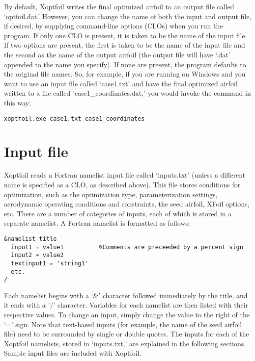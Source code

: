 \documentclass[11pt]{article}
\begin{document}
By default, Xoptfoil writes the final optimized airfoil to an output file called
`optfoil.dat.'  However, you can change the name of both the input and output file, if
desired, by supplying command-line options (CLOs) when you run the program.  If only one 
CLO is present, it is
taken to be the name of the input file.  If two options are present, the first is taken to
be the name of the input file and the second as
the name of the output airfoil (the output file will have `.dat' appended to the name you
specify). If none are present, the program defaults to the
original file names.  So, for example, if you are running on Windows and you want to
use an input file called `case1.txt' and have the final optimized airfoil written to a
file called 'case1\_coordinates.dat,' you would invoke the command in this way:

\begin{verbatim}
xoptfoil.exe case1.txt case1_coordinates
\end{verbatim}

\section{Input file}

Xoptfoil reads a Fortran namelist input file called `inputs.txt' (unless a different name
is specified as a CLO, as described above).  This file stores
conditions for optimization, such as the optimization type, parameterization settings,
aerodynamic operating conditions and constraints, the seed airfoil, XFoil options, etc.
There are a number of categories of inputs, each of which is stored in a separate
namelist.  A Fortran namelist is formatted as follows:

\begin{verbatim}
&namelist_title
  input1 = value1          %Comments are preceeded by a percent sign
  input2 = value2
  textinput1 = 'string1'
  etc.
/
\end{verbatim}

Each namelist begins with a `\&' character followed immediately by the title, and it ends with 
a '/' character.  Variables for each namelist are then listed with their respective
values.  To change an input, simply change the value to the right of the `=' sign.  Note
that text-based inputs (for example, the name of the seed airfoil file) need to be
surrounded by single or double quotes.  The inputs for each of the Xoptfoil namelists,
stored in `inputs.txt,' are explained in the following sections. Sample input files are
included with Xoptfoil.
\end{document}
